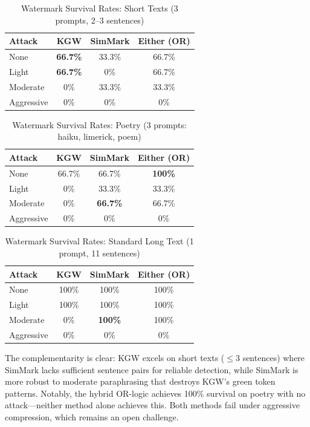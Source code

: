 \documentclass[12pt,letterpaper]{article}
\begin{document}
\begin{table}[H]
\centering
\caption{Watermark Survival Rates: Short Texts (3 prompts, 2--3 sentences)}
\label{tab:hybrid_short}
\begin{tabular}{lccc}
\toprule
\textbf{Attack} & \textbf{KGW} & \textbf{SimMark} & \textbf{Either (OR)} \\
\midrule
None & \textbf{66.7\%} & 33.3\% & 66.7\% \\
Light & \textbf{66.7\%} & 0\% & 66.7\% \\
Moderate & 0\% & 33.3\% & 33.3\% \\
Aggressive & 0\% & 0\% & 0\% \\
\bottomrule
\end{tabular}
\end{table}

\begin{table}[H]
\centering
\caption{Watermark Survival Rates: Poetry (3 prompts: haiku, limerick, poem)}
\label{tab:hybrid_poetry}
\begin{tabular}{lccc}
\toprule
\textbf{Attack} & \textbf{KGW} & \textbf{SimMark} & \textbf{Either (OR)} \\
\midrule
None & 66.7\% & 66.7\% & \textbf{100\%} \\
Light & 0\% & 33.3\% & 33.3\% \\
Moderate & 0\% & \textbf{66.7\%} & 66.7\% \\
Aggressive & 0\% & 0\% & 0\% \\
\bottomrule
\end{tabular}
\end{table}

\begin{table}[H]
\centering
\caption{Watermark Survival Rates: Standard Long Text (1 prompt, 11 sentences)}
\label{tab:hybrid_standard}
\begin{tabular}{lccc}
\toprule
\textbf{Attack} & \textbf{KGW} & \textbf{SimMark} & \textbf{Either (OR)} \\
\midrule
None & 100\% & 100\% & 100\% \\
Light & 100\% & 100\% & 100\% \\
Moderate & 0\% & \textbf{100\%} & 100\% \\
Aggressive & 0\% & 0\% & 0\% \\
\bottomrule
\end{tabular}
\end{table}

The complementarity is clear: KGW excels on short texts ($\leq 3$ sentences) where SimMark lacks sufficient sentence pairs for reliable detection, while SimMark is more robust to moderate paraphrasing that destroys KGW's green token patterns. Notably, the hybrid OR-logic achieves 100\% survival on poetry with no attack---neither method alone achieves this. Both methods fail under aggressive compression, which remains an open challenge.
\end{document}
